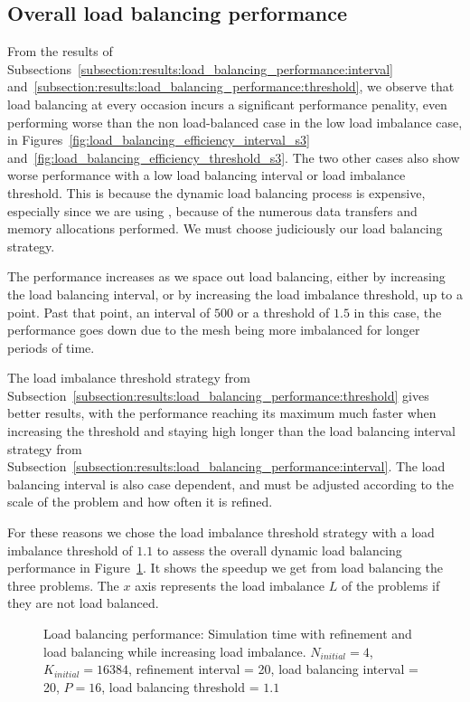 \subsection{Overall load balancing performance}\label{subsection:results:load_balancing_performance:overall}

From the results of Subsections~\ref{subsection:results:load_balancing_performance:interval}
and~\ref{subsection:results:load_balancing_performance:threshold}, we observe that load balancing at
every occasion incurs a significant performance penality, even performing worse than the non
load-balanced case in the low load imbalance case, in
Figures~\ref{fig:load_balancing_efficiency_interval_s3}
and~\ref{fig:load_balancing_efficiency_threshold_s3}. The two other cases also show worse
performance with a low load balancing interval or load imbalance threshold. This is because the
dynamic load balancing process is expensive, especially since we are using ,
because of the numerous data transfers and memory allocations performed. We must choose judiciously
our load balancing strategy. 

The performance increases as we space out load balancing, either by increasing the load balancing
interval, or by increasing the load imbalance threshold, up to a point. Past that point, an interval
of \(500\) or a threshold of \(1.5\) in this case, the performance goes down due to the mesh being
more imbalanced for longer periods of time.

The load imbalance threshold strategy from
Subsection~\ref{subsection:results:load_balancing_performance:threshold} gives better results, with
the performance reaching its maximum much faster when increasing the threshold and staying high
longer than the load balancing interval strategy from
Subsection~\ref{subsection:results:load_balancing_performance:interval}. The load balancing interval
is also case dependent, and must be adjusted according to the scale of the problem and how often it
is refined. 

For these reasons we chose the load imbalance threshold strategy with a load imbalance threshold of
\(1.1\) to assess the overall dynamic load balancing performance in
Figure~\ref{fig:load_balancing_efficiency}. It shows the speedup we get from load balancing the
three problems. The \(x\) axis represents the load imbalance \(L\) of the problems if they are not
load balanced.

\begin{figure}[H]
	\centering
	
	\caption{Load balancing performance: Simulation time with refinement and load balancing while increasing load imbalance. \(N_{initial} = 4\), \(K_{initial} = 16384\), refinement interval = 20, load balancing interval = 20, \(P = 16\), load balancing threshold = \(1.1\)}\label{fig:load_balancing_efficiency}
\end{figure}


